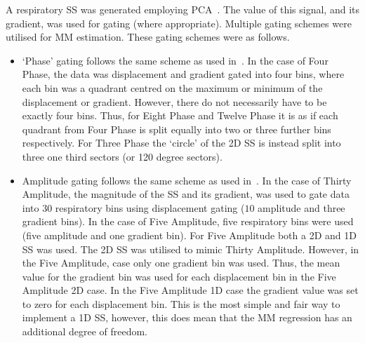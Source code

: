                 A respiratory \gls{SS} was generated employing \gls{PCA}~\parencite{Thielemans2011}. The value of this signal, and its gradient, was used for gating (where appropriate). Multiple gating schemes were utilised for \gls{MM} estimation. These gating schemes were as follows.

                \begin{itemize}
                    \item `Phase' gating follows the same scheme as used in~. In the case of Four Phase, the data was displacement and gradient gated into four bins, where each bin was a quadrant centred on the maximum or minimum of the displacement or gradient. However, there do not necessarily have to be exactly four bins. Thus, for Eight Phase and Twelve Phase it is as if each quadrant from Four Phase is split equally into two or three further bins respectively. For Three Phase the `circle' of the \gls{2D} \gls{SS} is instead split into three one third sectors (or 120 degree sectors).

                    \item Amplitude gating follows the same scheme as used in~. In the case of Thirty Amplitude, the magnitude of the \gls{SS} and its gradient, was used to gate data into $30$ respiratory bins using displacement gating ($10$ amplitude and three gradient bins). In the case of Five Amplitude, five respiratory bins were used (five amplitude and one gradient bin). For Five Amplitude both a \gls{2D} and \gls{1D} \gls{SS} was used. The \gls{2D} \gls{SS} was utilised to mimic Thirty Amplitude. However, in the Five Amplitude, case only one gradient bin was used. Thus, the mean value for the gradient bin was used for each displacement bin in the Five Amplitude \gls{2D} case. In the Five Amplitude \gls{1D} case the gradient value was set to zero for each displacement bin. This is the most simple and fair way to implement a \gls{1D} \gls{SS}, however, this does mean that the \gls{MM} regression has an additional degree of freedom.
                \end{itemize}
                
